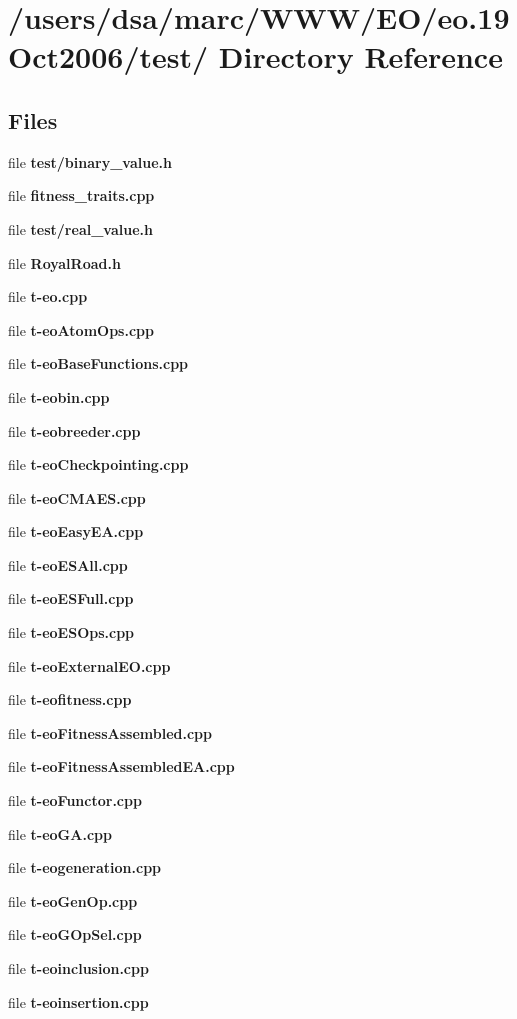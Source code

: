 \section{/users/dsa/marc/WWW/EO/eo.19Oct2006/test/ Directory Reference}
\label{dir_000002}
\subsection*{Files}
\begin{CompactItemize}
\item 
file {\bf test/binary_value.h}
\item 
file {\bf fitness_traits.cpp}
\item 
file {\bf test/real_value.h}
\item 
file {\bf RoyalRoad.h}
\item 
file {\bf t-eo.cpp}
\item 
file {\bf t-eoAtomOps.cpp}
\item 
file {\bf t-eoBaseFunctions.cpp}
\item 
file {\bf t-eobin.cpp}
\item 
file {\bf t-eobreeder.cpp}
\item 
file {\bf t-eoCheckpointing.cpp}
\item 
file {\bf t-eoCMAES.cpp}
\item 
file {\bf t-eoEasyEA.cpp}
\item 
file {\bf t-eoESAll.cpp}
\item 
file {\bf t-eoESFull.cpp}
\item 
file {\bf t-eoESOps.cpp}
\item 
file {\bf t-eoExternalEO.cpp}
\item 
file {\bf t-eofitness.cpp}
\item 
file {\bf t-eoFitnessAssembled.cpp}
\item 
file {\bf t-eoFitnessAssembledEA.cpp}
\item 
file {\bf t-eoFunctor.cpp}
\item 
file {\bf t-eoGA.cpp}
\item 
file {\bf t-eogeneration.cpp}
\item 
file {\bf t-eoGenOp.cpp}
\item 
file {\bf t-eoGOpSel.cpp}
\item 
file {\bf t-eoinclusion.cpp}
\item 
file {\bf t-eoinsertion.cpp}
\item 

\end{CompactItemize}
